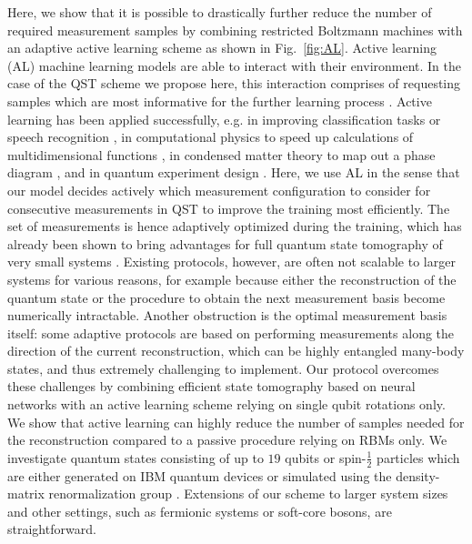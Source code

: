 \documentclass[pra,aps,showpacs,groupedaddress,superscriptaddress,twocolumn,toc=flat,biblatex,footinbib]{revtex4-1}
\begin{document}
Here, we show that it is possible to drastically further reduce the number of required measurement samples by combining restricted Boltzmann machines with an adaptive active learning scheme as shown in Fig.~\ref{fig:AL}. Active learning (AL) machine learning models are able to interact with their environment. In the case of the QST scheme we propose here, this interaction comprises of requesting samples which are most informative for the further learning process \cite{Settles2009}. Active learning has been applied successfully, e.g. in improving classification tasks \cite{Greiner2002, TongChang2001} or speech recognition \cite{Tur2005}, in computational physics to speed up calculations of multidimensional functions \cite{Yao2020}, in condensed matter theory to map out a phase diagram \cite{Ding2022}, and in quantum experiment design \cite{Ding2020}. 
Here, we use AL in the sense that our model decides actively which measurement configuration to consider for consecutive measurements in QST to improve the training most efficiently. The set of measurements is hence adaptively optimized during the training, which has already been shown to bring advantages for full quantum state tomography of very small systems \cite{Huzar2012, Mahler2013, Ferrie2014, Straupe2016}. Existing protocols, however, are often not scalable to larger systems for various reasons, for example because either the reconstruction of the quantum state or the procedure to obtain the next measurement basis become numerically intractable. Another obstruction is the optimal measurement basis itself: some adaptive protocols are based on performing measurements along the direction of the current reconstruction, which can be highly entangled many-body states, and thus extremely challenging to implement. Our protocol overcomes these challenges by combining efficient state tomography based on neural networks with an active learning scheme relying on single qubit rotations only. 
We show that active learning can highly reduce the number of samples needed for the reconstruction compared to a passive procedure relying on RBMs only. We investigate quantum states consisting of up to $19$ qubits or spin-$\frac{1}{2}$ particles which are either generated on IBM quantum devices or simulated using the density-matrix renormalization group \cite{Schollwoeck2011}. Extensions of our scheme to larger system sizes and other settings, such as fermionic systems or soft-core bosons, are straightforward.
\end{document}
